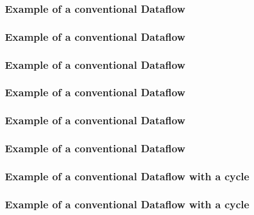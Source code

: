 \documentclass[aspectratio=169,10pt]{beamer}
\begin{document}
\begin{frame}
  \frametitle{Example of a conventional Dataflow}
  \begin{center}
    
  \end{center}
\end{frame}

\begin{frame}
  \frametitle{Example of a conventional Dataflow}
  \begin{center}
    
  \end{center}
\end{frame}

\begin{frame}
  \frametitle{Example of a conventional Dataflow}
  \begin{center}
    
  \end{center}
\end{frame}

\begin{frame}
  \frametitle{Example of a conventional Dataflow}
  \begin{center}
    
  \end{center}
\end{frame}

\begin{frame}
  \frametitle{Example of a conventional Dataflow}
  \begin{center}
    
  \end{center}
\end{frame}

\begin{frame}
  \frametitle{Example of a conventional Dataflow}
  \begin{center}
    
  \end{center}
\end{frame}

\begin{frame}[fragile]
  \frametitle{Example of a conventional Dataflow with a cycle}
  \begin{center}
    
  \end{center}
\end{frame}

\begin{frame}
  \frametitle{Example of a conventional Dataflow with a cycle}
  \begin{center}
    
  \end{center}
\end{frame}
\end{document}
